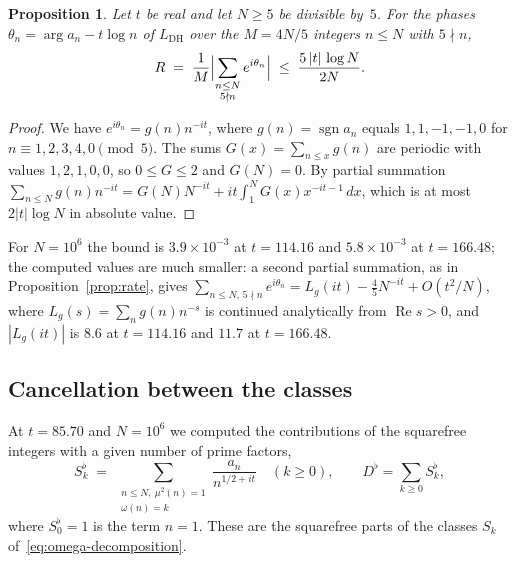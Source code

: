 \documentclass[11pt]{amsart}
\newtheorem{proposition}[theorem]{Proposition}
\theoremstyle{definition}
\theoremstyle{remark}
\renewcommand{\DH}{\mathrm{DH}}
\newcommand{\abs}[1]{\lvert #1 \rvert}
\newcommand{\re}{\operatorname{Re}}
\begin{document}
\begin{proposition}\label{prop:allterms}
Let $t$ be real and let $N\ge5$ be divisible by~$5$.  For the phases
$\theta_n=\arg a_n-t\log n$ of $L_{\DH}$ over the $M=4N/5$ integers
$n\le N$ with $5\nmid n$,
\[
  R\;=\;\frac1M\Bigl|\sum_{\substack{n\le N\\5\nmid n}}e^{i\theta_n}\Bigr|
  \;\le\;\frac{5\,\abs t\,\log N}{2N}.
\]
\end{proposition}

\begin{proof}
We have $e^{i\theta_n}=g(n)n^{-it}$, where $g(n)=\operatorname{sgn}a_n$
equals $1,1,-1,-1,0$ for $n\equiv1,2,3,4,0\pmod5$.  The sums
$G(x)=\sum_{n\le x}g(n)$ are periodic with values $1,2,1,0,0$, so
$0\le G\le2$ and $G(N)=0$.  By partial summation
$\sum_{n\le N}g(n)n^{-it}=G(N)N^{-it}+it\int_1^NG(x)x^{-it-1}\,dx$, which
is at most $2\abs t\log N$ in absolute value.
\end{proof}

For $N=10^6$ the bound is $3.9\times10^{-3}$ at $t=114.16$ and
$5.8\times10^{-3}$ at $t=166.48$; the computed values are much smaller:
a second partial summation, as in Proposition~\ref{prop:rate}, gives
$\sum_{n\le N,\,5\nmid n}e^{i\theta_n}=L_g(it)-\tfrac45N^{-it}+O(t^2/N)$,
where $L_g(s)=\sum_ng(n)n^{-s}$ is continued analytically from $\re s>0$, and $|L_g(it)|$ is $8.6$ at $t=114.16$
and $11.7$ at $t=166.48$.

\subsection{Cancellation between the classes}
\label{ssec:interference}

At $t = 85.70$ and $N = 10^6$ we computed the contributions of the
squarefree integers with a given number of prime factors,
\[
  S_k^\flat \;=\; \sum_{\substack{n\le N,\ \mu^2(n)=1\\ \omega(n)=k}}
  \frac{a_n}{n^{1/2+it}}\quad(k\ge0),
  \qquad D^\flat=\sum_{k\ge0}S_k^\flat ,
\]
where $S_0^\flat=1$ is the term $n=1$.  These are the squarefree parts of
the classes $S_k$ of~\eqref{eq:omega-decomposition}.
\end{document}
